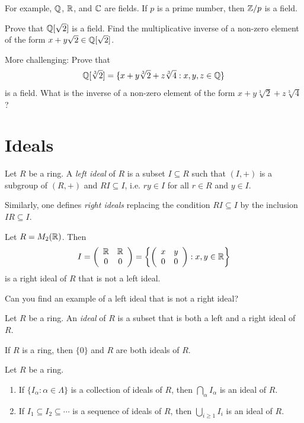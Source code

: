 For example, $\mathbb{Q}$, $\mathbb{R}$, and $\mathbb{C}$ are fields. 
If $p$ is a prime number, then $\mathbb{Z}/p$ is a field. 	

\begin{exercise}
\label{xca:Qsqrt2}
	Prove that $\mathbb{Q}[\sqrt{2}]$ is a field. 
	Find the multiplicative inverse of a non-zero element of the form 
	$x+y\sqrt{2}\in\mathbb{Q}[\sqrt{2}]$.  
\end{exercise}

More challenging: Prove that 
\[
\mathbb{Q}[\sqrt[3]{2}]=\{x+y\sqrt[3]{2}+z\sqrt[3]{4}:x,y,z\in\mathbb{Q}\}
\]
is a field. What is the inverse of a non-zero element of the form $x+y\sqrt[3]{2}+z\sqrt[3]{4}$?

\section{Ideals}

\begin{definition}
	Let $R$ be a ring. A \emph{left ideal} of $R$ is a subset $I\subseteq R$ such that 
	$(I,+)$ is a subgroup of $(R,+)$ and $RI\subseteq I$, 
	i.e. $ry\in I$ for all $r\in R$ and $y\in I$. 
\end{definition}

Similarly, one defines \emph{right ideals} replacing 
the condition $RI\subseteq I$ by 
the inclusion 
$IR\subseteq I$. 

\begin{example}
Let $R=M_{2}(\mathbb{R})$. Then   
\[
I=\left(\begin{array}{cc}
\mathbb{R} & \mathbb{R}\\
0 & 0
\end{array}\right)=\left\{ \left(\begin{array}{cc}
x & y\\
0 & 0
\end{array}\right):x,y\in\mathbb{R}\right\} 
\]
is a right ideal of $R$ that is not a left ideal. 
\end{example}

Can you find an 
example of a left ideal that is not a right ideal?

\begin{definition}
Let $R$ be a ring. An \emph{ideal} of $R$ 
is a subset that is both a left and a right ideal of $R$. 
\end{definition}
 
If $R$ is a ring, then $\{0\}$ and $R$ are both ideals of $R$. 

\begin{exercise}
  \label{xca:ideals}
  Let $R$ be a ring. 
  \begin{enumerate}
    \item If $\{I_\alpha:\alpha\in\Lambda\}$ is a collection of ideals of $R$, then $\bigcap_{\alpha}I_\alpha$ is an ideal of $R$.  	
    \item If $I_1\subseteq I_2\subseteq\cdots$ is a sequence of ideals of $R$, then $\bigcup_{i\geq1}I_i$ is an ideal of $R$. 
  \end{enumerate}
\end{exercise}


